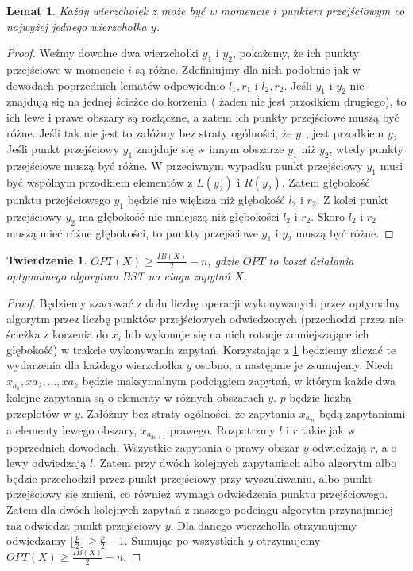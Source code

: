 \documentclass[declaration,shortabstract]{iithesis}
\newcounter{thm}[section]
\theoremstyle{thm}
\theoremstyle{remark}
\theoremstyle{plain}
\newtheorem{theorem}[thm]{Twierdzenie}
\theoremstyle{plain}
\theoremstyle{plain}
\newtheorem{lemma}[thm]{Lemat}
\begin{document}
\begin{lemma} 
\label{eig_trans_point} 
Każdy wierzchołek $z$ może być w momencie $i$ punktem przejściowym co najwyżej jednego wierzchołka $y$. 
\end{lemma} 
\begin{proof} 
Weźmy dowolne dwa wierzchołki $y_1$ i $y_2$, pokażemy, że ich punkty przejściowe w momencie $i$ są różne. Zdefiniujmy dla nich podobnie jak w dowodach poprzednich lematów odpowiednio $l_1, r_1$ i $l_2, r_2$. Jeśli $y_1$ i $y_2$ nie znajdują się na jednej ścieżce do korzenia ( żaden nie jest przodkiem drugiego), to ich lewe i prawe obszary są rozłączne, a zatem ich punkty przejściowe muszą być różne. Jeśli tak nie jest to załóżmy bez straty ogólności, że $y_1$, jest przodkiem $y_2$. Jeśli punkt przejściowy $y_1$ znajduje się w innym obszarze $y_1$ niż $y_2$, wtedy punkty przejściowe muszą być różne. W przeciwnym wypadku punkt przejściowy $y_1$ musi być wspólnym przodkiem elementów z $L(y_2)$ i $R(y_2)$. Zatem głębokość punktu przejściowego $y_1$ będzie nie większa niż głębokość $l_2$ i $r_2$. Z kolei punkt przejściowy $y_2$ ma głębokość nie mniejszą niż głębokości $l_2$ i $r_2$. Skoro $l_2$ i $r_2$ muszą mieć różne głębokości, to punkty przejściowe $y_1$ i $y_2$ muszą być różne.  
\end{proof} 
\begin{theorem} 
\label{low_bound} 
\(OPT(X) \geq \frac{IB(X)}{2} - n\), gdzie $OPT$ to koszt działania optymalnego algorytmu BST na ciagu zapytań $X$. 
\end{theorem} 
\begin{proof} 
Będziemy szacować z dołu liczbę operacji wykonywanych przez optymalny algorytm przez liczbę punktów przejściowych odwiedzonych (przechodzi przez nie ścieżka z korzenia do $x_i$ lub wykonuje się na nich rotacje zmniejszające ich głębokość) w trakcie wykonywania zapytań. Korzystając z \ref{eig_trans_point} będziemy zliczać te wydarzenia dla każdego wierzchołka $y$ osobno, a następnie je zsumujemy. Niech \( x_{a_1}, x{a_2}, ..., x{a_k}\) będzie maksymalnym podciągiem zapytań, w którym każde dwa kolejne zapytania są o elementy w różnych obszarach $y$. $p$ będzie liczbą przeplotów w $y$. Załóżmy bez straty ogólności, że zapytania \(x_{a_{2i}}\) będą zapytaniami a elementy lewego obszary, \(x_{a_{2i+1}}\) prawego. Rozpatrzmy $l$ i $r$ takie jak w poprzednich dowodach. Wszystkie zapytania o prawy obszar $y$ odwiedzają $r$, a o lewy odwiedzają $l$. Zatem przy dwóch kolejnych zapytaniach albo algorytm albo będzie przechodził przez punkt przejściowy przy wyszukiwaniu, albo punkt przejściowy się zmieni, co również wymaga odwiedzenia punktu przejściowego. Zatem dla dwóch kolejnych zapytań z naszego podciągu algorytm przynajmniej raz odwiedza punkt przejściowy $y$. Dla danego wierzchołla otrzymujemy odwiedzamy \(\lfloor \frac{p}{2} \rfloor \geq \frac{p}{2} -1\).  Sumując po wszystkich $y$ otrzymujemy \(OPT(X) \geq \frac{IB(X)}{2} - n\). 
\end{proof}  
\end{document}
